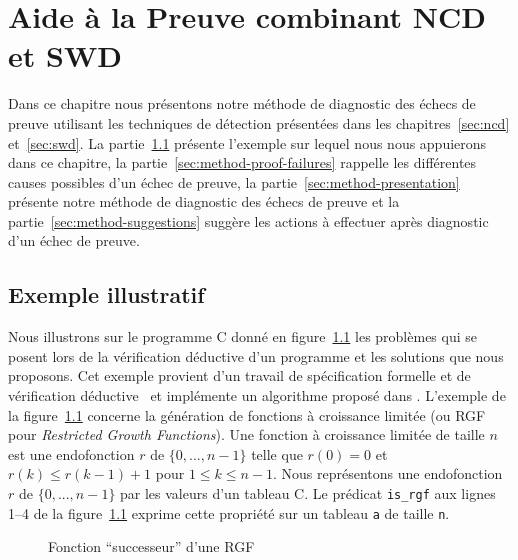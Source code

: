 
\chapter{Aide à la Preuve combinant NCD et SWD}
\label{sec:method}

\chapterintro


Dans ce chapitre nous présentons notre méthode de diagnostic des échecs de
preuve utilisant les techniques de détection présentées dans les
chapitres~\ref{sec:ncd} et~\ref{sec:swd}.
La partie~\ref{sec:method-ex} présente l'exemple sur lequel nous nous
appuierons dans ce chapitre, la partie~\ref{sec:method-proof-failures} rappelle
les différentes causes possibles d'un échec de preuve, la
partie~\ref{sec:method-presentation} présente notre méthode de diagnostic des
échecs de preuve et la partie~\ref{sec:method-suggestions} suggère les actions
à effectuer après diagnostic d'un échec de preuve.


\section{Exemple illustratif}
\label{sec:method-ex}


Nous illustrons sur le programme C donné en figure~\ref{fig:rgf1} les problèmes
qui se posent lors de la vérification déductive d'un programme et les solutions
que nous proposons.
Cet exemple provient d'un travail de spécification formelle et de vérification
déductive~\cite{Genestier/TAP15} et implémente un algorithme proposé
dans \cite[page 235]{Arndt/10}.
L'exemple de la figure~\ref{fig:rgf1} concerne la génération de fonctions à
croissance limitée (ou RGF pour \textit{Restricted Growth Functions}).
Une fonction à croissance limitée de taille $n$ est une endofonction $r$ de
$\{0, ..., n-1\}$ telle que $r(0) = 0$ et $r(k) \le r(k-1)+1$ pour
$1 \le k \le n-1$.
Nous représentons une endofonction $r$ de $\{0, ..., n-1\}$ par les valeurs d'un
tableau C.
Le prédicat \acsl \lstinline{is_rgf} aux lignes 1--4 de la figure~\ref{fig:rgf1}
exprime cette propriété sur un tableau \lstinline'a' de taille \lstinline'n'.


\begin{figure}[tb]
  \centering
  
  \caption{Fonction ``successeur'' d'une RGF \label{fig:rgf1}}
\end{figure}


